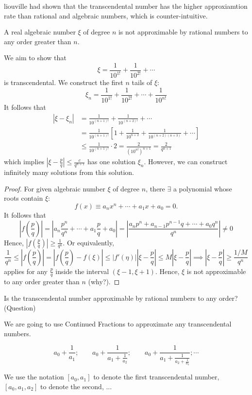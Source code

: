 liouville had shown that the transcendental number has the higher approxiamtion rate than rational and algebraic numbers, which is counter-intuitive.

\begin{theorem}[Liouville, 1844]
A real algebraic number $\xi$ of degree $n$ is not approximable by rational numbers to any order greater than $n$.
\end{theorem}
\begin{example}
We aim to show that
\[
\xi=\frac{1}{10^{1!}}+\frac{1}{10^{2!}}+\cdots
\]
is transcendental. We construct the first $n$ tails of $\xi$:
\[
\xi_n=\frac{1}{10^{1!}}+\frac{1}{10^{2!}}+\cdots+\frac{1}{10^{n!}}
\]
It follows that
\begin{align*}
|\xi-\xi_n|&=\frac{1}{10^{(n+1)!}}+\frac{1}{10^{(n+2)!}}+\cdots\\
&=\frac{1}{10^{(n+1)!}}\left[1+\frac{1}{10^{n+2}}+\frac{1}{10^{(n+2)(n+3)}}+\cdots\right]\\
&\le\frac{1}{10^{(n+1)!}}\cdot 2 = \frac{2}{(10^{n!})^{n+1}}=\frac{2}{q^{n+1}}
\end{align*}
which implies $|\xi-\frac{p}{q}|\le\frac{c}{q^{n+1}}$ has one solution $\xi_n$. However, we can construct infinitely many solutions from this solution.
\end{example}

\begin{proof}
For given algebraic number $\xi$ of degree $n$, there $\exists$ a polynomial whose roots contain $\xi$:
\[
f(x) \equiv a_nx^n+\cdots+a_1x+a_0=0.
\]
It follows that
\[
\left|f(\frac{p}{q})\right|=\left|a_n\frac{p^n}{q^n}+\cdots+a_1\frac{p}{q}+a_0\right|
=\left|\frac{a_np^n+a_{n-1}p^{n-1}q+\cdots+a_0q^n}{q^n}\right|\ne0
\]
Hence, $\left|f(\frac{p}{q})\right|\ge\frac{1}{q^n}$. Or equivalently,
\[
\frac{1}{q^n}\le\left|f(\frac{p}{q})\right| = \left|f(\frac{p}{q})-f(\xi)\right|\le
|f'(\eta)||\xi-\frac{p}{q}|\le M|\xi-\frac{p}{q}|\implies
|\xi-\frac{p}{q}|\ge\frac{1/M}{q^n}
\]
applies for any $\frac{p}{q}$ inside the interval $(\xi-1,\xi+1)$. Hence, $\xi$ is not approximable to any order greater than $n$ (why?).
\end{proof}

Is the transcendental number approximable by rational numbers to any order? (Question)

We are going to use Continued Fractions to approximate any transcendental numbers.
\begin{theorem}
\[
a_0+\frac{1}{a_1};
\qquad
a_0+\frac{1}{a_1+\frac{1}{a_2}};
\qquad
a_0+\frac{1}{a_1+\frac{1}{a_2+\frac{1}{a_3}}};
\cdots
\]
\end{theorem}
We use the notation $[a_0,a_1]$ to denote the first transcendental number, $[a_0,a_1,a_2]$ to denote the second, ...

